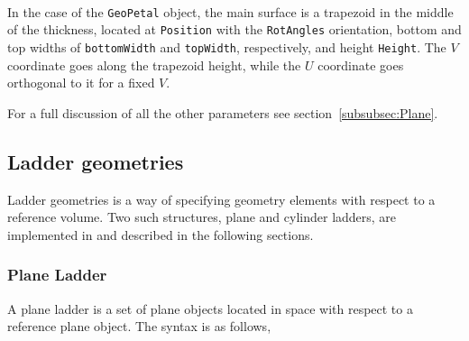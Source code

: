~\\
In the case of the {\tt GeoPetal} object, the main surface is a trapezoid in the middle of the thickness, located at {\tt Position} with 
the {\tt RotAngles} orientation, bottom and top widths of  {\tt bottomWidth} and {\tt topWidth}, respectively, and height {\tt Height}. 
The $V$ coordinate goes along the trapezoid height, while the $U$ coordinate goes orthogonal to it for a fixed $V$.

For a full discussion of all the other parameters see section~\ref{subsubsec:Plane}.

\subsection{Ladder geometries}

Ladder geometries is a way of specifying geometry elements with respect to a reference volume. Two such structures, plane and cylinder ladders, 
are implemented in {\guari} and described in the following sections.

\subsubsection{Plane Ladder}

A plane ladder is a set of plane objects located in space with respect to a reference plane object.
The syntax is as follows,

